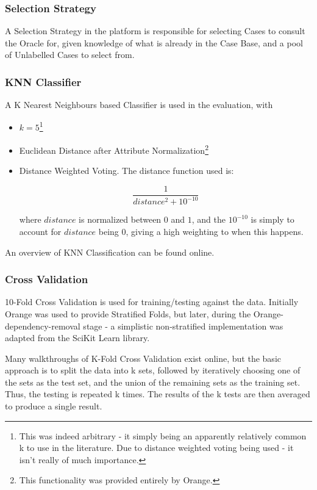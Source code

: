 \documentclass[a4paper,11pt]{report}
\begin{document}
\subsubsection{Selection Strategy}

A Selection Strategy in the platform is responsible for selecting Cases to consult the Oracle for, given knowledge of what is already in the Case Base, and a pool of Unlabelled Cases to select from.

\subsubsection{KNN Classifier}
A K Nearest Neighbours based Classifier is used in the evaluation, with 
\begin{itemize}
	\item $k=5$\footnote{This was indeed arbitrary - it simply being an apparently relatively common k to use in the literature. Due to distance weighted voting being used - it isn't really of much importance.} 
	\item Euclidean Distance after Attribute Normalization\footnote {This functionality was provided entirely by Orange.}
	\item Distance Weighted Voting. The distance function used is:
	
	\[
	\frac{1}{distance^{2}+10^{-10}}
	\]
	
	where $distance$ is normalized between $0$ and $1$, and the $10^{-10}$ is simply to account for $distance$ being $0$, giving a high weighting to when this happens.
	
	
\end{itemize}

An overview of KNN Classification can be found online\citep{web:knntut}.

\subsubsection{Cross Validation}

10-Fold Cross Validation is used for training/testing against the data. Initially Orange was used to provide Stratified Folds, but later, during the Orange-dependency-removal stage - a simplistic non-stratified implementation was adapted from the SciKit Learn library\citep{prog:sklearn}.

Many walkthroughs of K-Fold Cross Validation exist online\citep{web:kfolddemo}, but the basic approach is to split the data into k sets, followed by iteratively choosing one of the sets as the test set, and the union of the remaining sets as the training set. Thus, the testing is repeated k times. The results of the k tests are then averaged to produce a single result.
\end{document}
